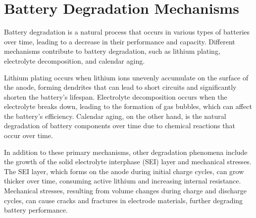\chapter{Battery Degradation Mechanisms}

Battery degradation is a natural process that occurs in various types of batteries over time, leading to a decrease in their performance and capacity. Different mechanisms contribute to battery degradation, such as lithium plating, electrolyte decomposition, and calendar aging. 

Lithium plating occurs when lithium ions unevenly accumulate on the surface of the anode, forming dendrites that can lead to short circuits and significantly shorten the battery's lifespan. Electrolyte decomposition occurs when the electrolyte breaks down, leading to the formation of gas bubbles, which can affect the battery's efficiency. Calendar aging, on the other hand, is the natural degradation of battery components over time due to chemical reactions that occur over time. 

In addition to these primary mechanisms, other degradation phenomena include the growth of the solid electrolyte interphase (SEI) layer and mechanical stresses. The SEI layer, which forms on the anode during initial charge cycles, can grow thicker over time, consuming active lithium and increasing internal resistance. Mechanical stresses, resulting from volume changes during charge and discharge cycles, can cause cracks and fractures in electrode materials, further degrading battery performance. 


